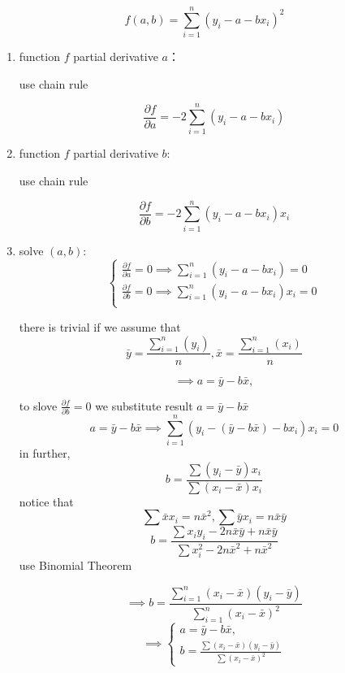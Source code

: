 \documentclass[12pt]{article}
\begin{document}
\[
f(a,b) = \sum_{i=1}^n (y_i - a - b x_i)^2
\]

\begin{enumerate}
  \item function $f$ partial derivative $a$：
  
  use chain rule
  
  \[
    \frac{\partial f}{\partial a} = -2 \sum_{i=1}^n (y_i - a - b x_i)
  \]

  \item function $f$ partial derivative $b$: 
  
  use chain rule
  
  \[
    \frac{\partial f}{\partial b} = -2 \sum_{i=1}^n (y_i - a - b x_i) x_i
  \]

  \item solve $(a,b)$:
  \[
    \begin{cases}
        \frac{\partial f}{\partial a} = 0 
        \implies\sum_{i=1}^n (y_i - a - b x_i) = 0
         \\[2mm]
        \frac{\partial f}{\partial b} = 0 \implies \sum_{i=1}^n (y_i - a - b x_i)x_i = 0
        \\[1mm]
        \end{cases}
    \]
  
there is trivial if we assume that
   \[
    \bar{y} = \frac{\sum_{i = 1}^n(y_i)}{n},
    \bar{x} = \frac{\sum_{i = 1}^n(x_i)}{n}
   \]
   
    \[ \implies  a = \bar{y} - b \bar{x},\]

   to slove $\frac{\partial f}{\partial b} = 0$ we substitute result $a = \bar{y} - b \bar{x}$
     \[
        a = \bar{y} - b \bar{x}
     \implies \sum_{i=1}^n (y_i - (\bar{y}-b\bar{x}) - b x_i)x_i = 0 
     \]
     in further,
     \[
     b = \frac{\sum(y_i - \bar{y})x_i}{\sum(x_i - \bar{x})x_i}
     \]
     notice that \[\sum{\bar{x}x_i} = n\bar{x}^2 , \sum{\bar{y}x_i} = n\bar{x}\bar{y} \]
 \[ b = \frac{\sum{x_iy_i-2n\bar{x}\bar{y}}+n\bar{x}\bar{y}}{\sum{x_i^2-2n\bar{x}^2}+n\bar{x}^2} \]   
 use Binomial Theorem

    \[\implies b = \frac{\sum_{i=1}^n (x_i - \bar{x})(y_i - \bar{y})}{\sum_{i=1}^n (x_i - \bar{x})^2}
        \]
    \[\implies
    \begin{cases}
    
    a = \bar{y} - b \bar{x}, \\[2mm]
        
    b = \frac{\sum(x_i - \bar{x})(y_i - \bar{y})}{\sum (x_i - \bar{x})^2}
        \end{cases}
    \]
\end{enumerate}
\end{document}
